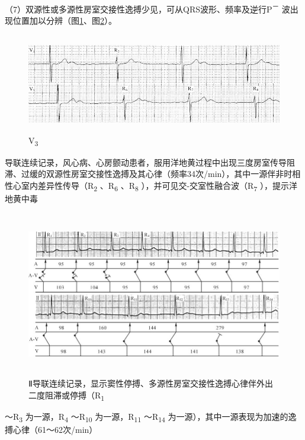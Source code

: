 （7）双源性或多源性房室交接性逸搏少见，可从QRS波形、频率及逆行P\textsuperscript{－}
波出现位置加以分辨（图\ref{fig12-7}、图\ref{fig12-8}）。

\begin{figure}[!htbp]
 \centering
 \includegraphics[width=5.58333in,height=1.70833in]{./images/Image00200.jpg}
 \captionsetup{justification=centering}
 \caption{V\textsubscript{3}}
 \label{fig12-7}
  \end{figure} 
导联连续记录，风心病、心房颤动患者，服用洋地黄过程中出现三度房室传导阻滞、过缓的双源性房室交接性逸搏及其心律（频率34次/min），其中一源伴非时相性心室内差异性传导（R\textsubscript{2}
、R\textsubscript{6} 、R\textsubscript{8}
），并可见交-交室性融合波（R\textsubscript{7} ），提示洋地黄中毒

\begin{figure}[!htbp]
 \centering
 \includegraphics[width=5.76042in,height=2.84375in]{./images/Image00201.jpg}
 \captionsetup{justification=centering}
 \caption{Ⅱ导联连续记录，显示窦性停搏、多源性房室交接性逸搏心律伴外出二度阻滞或停搏（R\textsubscript{1}}
 \label{fig12-8}
  \end{figure} 
～R\textsubscript{3} 为一源，R\textsubscript{4} ～R\textsubscript{10}
为一源，R\textsubscript{11} ～R\textsubscript{14}
为一源），其中一源表现为加速的逸搏心律（61～62次/min）

\protect\hypertarget{text00019.htmlux5cux23subid183}{}{}

